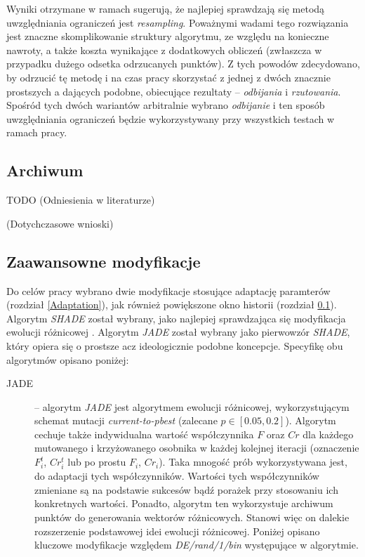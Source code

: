 \documentclass[12pt,a4paper]{report}
\begin{document}
{{{{\begin{description}
\end{description}
}
\par{
Wyniki otrzymane w ramach \cite{Boundary} sugerują, że najlepiej sprawdzają się metodą uwzględniania ograniczeń jest \emph{resampling}. Poważnymi wadami tego rozwiązania jest znaczne skomplikowanie struktury algorytmu, ze względu na konieczne nawroty, a także koszta wynikające z dodatkowych obliczeń (zwłaszcza w przypadku dużego odsetka odrzucanych punktów). Z tych powodów zdecydowano, by odrzucić tę metodę i na czas pracy skorzystać z jednej z dwóch znacznie prostszych a dających podobne, obiecujące rezultaty -- \emph{odbijania} i \emph{rzutowania}. Spośród tych dwóch wariantów arbitralnie wybrano \emph{odbijanie} i ten sposób uwzględniania ograniczeń będzie wykorzystywany przy wszystkich testach w ramach pracy.
}

\subsection{Archiwum}
\label{ArchiveLiterature}
\par{
TODO
(Odniesienia w literaturze)
\cite{JADE,SHADE,ClusterArchiveDE,RobustArchiveDE,ArchivedDE}
}
\par{(Dotychczasowe wnioski)}

\subsection{Zaawansowne modyfikacje}
\par{
Do celów pracy wybrano dwie modyfikacje stosujące adaptację paramterów (rozdział \ref{Adaptation}), jak również powiększone okno historii (rozdział \ref{ArchiveLiterature}). Algorytm \emph{SHADE} \cite{SHADE} został wybrany, jako najlepiej sprawdzająca się modyfikacja ewolucji różnicowej \cite{CEC2013Comp}. Algorytm \emph{JADE} \cite{JADE} został wybrany jako pierwowzór \emph{SHADE}, który opiera się o prostsze acz ideologicznie podobne koncepcje. Specyfikę obu algorytmów opisano poniżej:
}
\begin{description}
\item[JADE] \cite{JADE} -- algorytm \emph{JADE} jest algorytmem ewolucji różnicowej, wykorzystującym schemat mutacji \emph{current-to-pbest} (zalecane $p \in [0.05, 0.2]$). Algorytm cechuje także indywidualna wartość współczynnika $F$ oraz $Cr$ dla każdego mutowanego i krzyżowanego osobnika w każdej kolejnej iteracji (oznaczenie $F_i^t$, $Cr_i^t$ lub po prostu $F_i$, $Cr_i$). Taka mnogość prób wykorzystywana jest, do adaptacji tych współczynników. Wartości tych współczynników zmieniane są na podstawie sukcesów bądź porażek przy stosowaniu ich konkretnych wartości. Ponadto, algorytm ten wykorzystuje archiwum punktów do generowania wektorów różnicowych. Stanowi więc on dalekie rozszerzenie podstawowej idei ewolucji różnicowej. Poniżej opisano kluczowe modyfikacje względem \emph{DE/rand/1/bin} występujące w algorytmie.

\end{description}}}}
\end{document}
